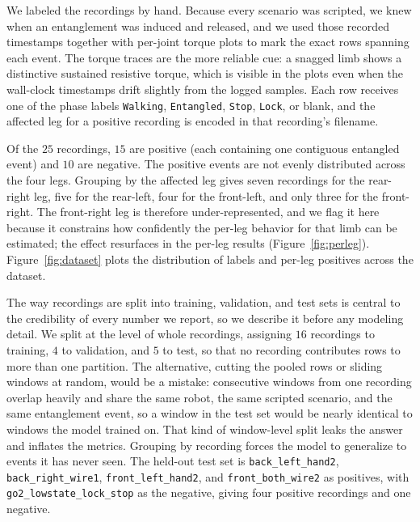 We labeled the recordings by hand. Because every scenario was scripted, we knew when an entanglement was induced and released, and we used those recorded timestamps together with per-joint torque plots to mark the exact rows spanning each event. The torque traces are the more reliable cue: a snagged limb shows a distinctive sustained resistive torque, which is visible in the plots even when the wall-clock timestamps drift slightly from the logged samples. Each row receives one of the phase labels \texttt{Walking}, \texttt{Entangled}, \texttt{Stop}, \texttt{Lock}, or blank, and the affected leg for a positive recording is encoded in that recording's filename.

Of the $25$ recordings, $15$ are positive (each containing one contiguous entangled event) and $10$ are negative. The positive events are not evenly distributed across the four legs. Grouping by the affected leg gives seven recordings for the rear-right leg, five for the rear-left, four for the front-left, and only three for the front-right. The front-right leg is therefore under-represented, and we flag it here because it constrains how confidently the per-leg behavior for that limb can be estimated; the effect resurfaces in the per-leg results (Figure~\ref{fig:perleg}). Figure~\ref{fig:dataset} plots the distribution of labels and per-leg positives across the dataset.

The way recordings are split into training, validation, and test sets is central to the credibility of every number we report, so we describe it before any modeling detail. We split at the level of whole recordings, assigning $16$ recordings to training, $4$ to validation, and $5$ to test, so that no recording contributes rows to more than one partition. The alternative, cutting the pooled rows or sliding windows at random, would be a mistake: consecutive windows from one recording overlap heavily and share the same robot, the same scripted scenario, and the same entanglement event, so a window in the test set would be nearly identical to windows the model trained on. That kind of window-level split leaks the answer and inflates the metrics. Grouping by recording forces the model to generalize to events it has never seen. The held-out test set is \texttt{back\_left\_hand2}, \texttt{back\_right\_wire1}, \texttt{front\_left\_hand2}, and \texttt{front\_both\_wire2} as positives, with \texttt{go2\_lowstate\_lock\_stop} as the negative, giving four positive recordings and one negative.